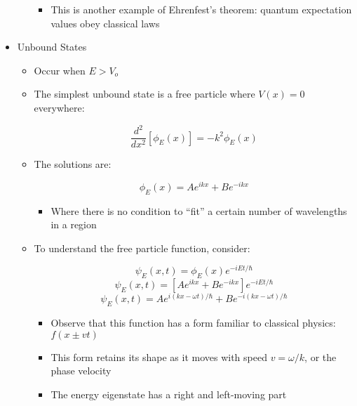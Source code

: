 \begin{itemize}
\begin{itemize}
\begin{itemize}
          \item This is another example of Ehrenfest's theorem: quantum expectation values obey classical laws

        \end{itemize}

    \end{itemize}

  \item Unbound States

    \begin{itemize}

      \item Occur when $E>V_o$

      \item The simplest unbound state is a free particle where $V(x)=0$ everywhere:

        $$\frac{d^2}{dx^2}[\phi_E(x)]=-k^2\phi_E(x)$$

      \item The solutions are:

        $$\phi_E(x)=Ae^{ikx}+Be^{-ikx}$$

        \begin{itemize}

          \item Where there is no condition to ``fit'' a certain number of wavelengths in a region

        \end{itemize}

      \item To understand the free particle function, consider:

        $$\psi_E(x,t)=\phi_E(x)e^{-iEt/\hbar}$$
        $$\psi_E(x,t)=\left[  Ae^{ikx}+Be^{-ikx}\right]e^{-iEt/\hbar}$$
        $$\psi_E(x,t)=Ae^{i(kx-\omega t)/\hbar}+Be^{-i(kx-\omega t)/\hbar}$$

        \begin{itemize}

          \item Observe that this function has a form familiar to classical physics: $f(x\pm vt)$

          \item This form retains its shape as it moves with speed $v=\omega/k$, or the phase velocity
            
          \item The energy eigenstate has a right and left-moving part

        \end{itemize}


\end{itemize}
\end{itemize}
